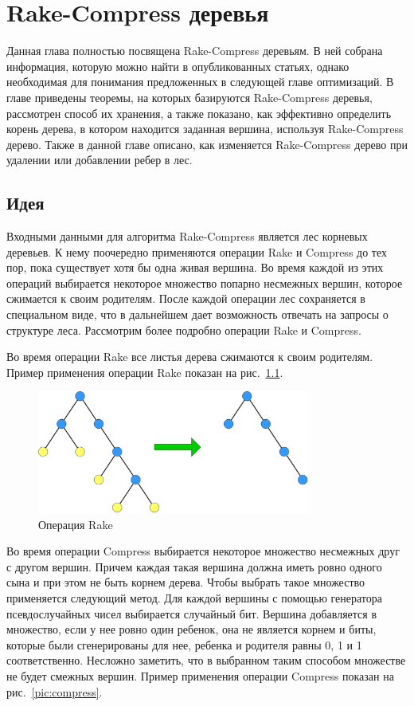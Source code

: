 
\chapter{Rake-Compress деревья}

Данная глава полностью посвящена Rake-Compress деревьям. 
В ней собрана информация, которую можно найти в опубликованных статьях, однако необходимая для понимания предложенных в следующей главе оптимизаций.
В главе приведены теоремы, на которых базируются Rake-Compress деревья, 
рассмотрен способ их хранения, 
а также показано, как эффективно определить корень дерева, в котором находится заданная вершина, используя Rake-Compress дерево.
Также в данной главе описано, как изменяется Rake-Compress дерево при удалении или добавлении ребер в лес.

\FloatBarrier
\section{Идея}

Входными данными для алгоритма Rake-Compress является лес корневых деревьев. К нему поочередно применяются операции Rake и Compress до тех пор, пока существует хотя бы одна живая вершина. 
Во время каждой из этих операций выбирается некоторое множество попарно несмежных вершин, которое сжимается к своим родителям. 
После каждой операции лес сохраняется в специальном виде, что в дальнейшем дает возможность отвечать на запросы о структуре леса. Рассмотрим более подробно операции Rake и Compress.

Во время операции Rake все листья дерева сжимаются к своим родителям. Пример применения операции Rake показан на рис.~\ref{pic:rake}.

\begin{figure}[h]
\centering
\includegraphics[width=0.8\textwidth]{pics/rake.png}
\caption{Операция Rake}
\label{pic:rake}
\end{figure}

Во время операции Compress выбирается некоторое множество несмежных друг с другом вершин.
Причем каждая такая вершина должна иметь ровно одного сына и при этом не быть корнем дерева. Чтобы выбрать такое множество применяется следующий метод.
Для каждой вершины с помощью генератора псевдослучайных чисел выбирается случайный бит. Вершина добавляется в множество, если у нее ровно один ребенок, она не является корнем и биты, 
которые были сгенерированы для нее, ребенка и родителя равны 0, 1 и 1 соответственно. Несложно заметить, что в выбранном таким способом множестве не будет смежных вершин.
Пример применения операции Compress показан на рис.~\ref{pic:compress}.

